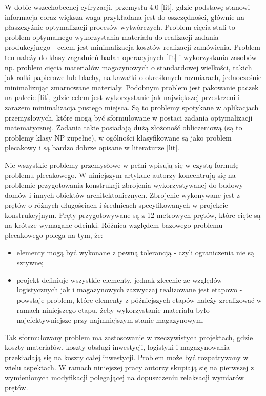 W dobie wszechobecnej cyfryzacji, przemysłu 4.0 [lit], gdzie podstawę stanowi informacja coraz większa waga przykładana jest do oszczędności, głównie na płaszczyźnie optymalizacji procesów wytwórczych. Problem cięcia stali to problem optymalnego wykorzystania materiału do realizacji zadania produkcyjnego - celem jest minimalizacja kosztów realizacji zamówienia. Problem ten należy do klasy zagadnień badan operacyjnych [lit] i wykorzystania zasobów - np. problem cięcia materiałów magazynowych o standardowej wielkości, takich jak rolki papierowe lub blachy, na kawałki o określonych rozmiarach, jednocześnie minimalizując zmarnowane materiały. Podobnym problem jest pakowanie paczek na palecie [lit], gdzie celem jest wykorzystanie jak największej przestrzeni i zarazem minimalizacja pustego miejsca. Są to problemy spotykane w aplikacjach przemysłowych, które mogą być sformułowane w postaci zadania optymalizacji matematycznej. Zadania takie posiadają dużą złożoność obliczeniową (są to problemy klasy NP zupełne), w ogólności klasyfikowane są jako problem plecakowy i są bardzo dobrze opisane w literaturze [lit].

Nie wszystkie problemy przemysłowe w pełni wpisują się w czystą formułę problemu plecakowego. W niniejszym artykule autorzy koncentrują się na problemie przygotowania konstrukcji zbrojenia wykorzystywanej do budowy domów i innych obiektów architektonicznych. Zbrojenie wykonywane jest z prętów o różnych długościach i średnicach specyfikowanych w projekcie konstrukcyjnym. Pręty przygotowywane są z 12 metrowych prętów, które cięte są na krótsze wymagane odcinki. Różnica względem bazowego problemu plecakowego polega na tym, że:
\begin{itemize}
\item elementy mogą być wykonane z pewną tolerancją - czyli ograniczenia nie są sztywne;
\item projekt definiuje wszystkie elementy, jednak zlecenie ze względów logistycznych jak i magazynowych zazwyczaj realizowane jest etapowo - powstaje problem, które elementy z późniejszych etapów należy zrealizować w ramach niniejszego etapu, żeby wykorzystanie materiału było najefektywniejsze przy najmniejszym stanie magazynowym. 
\end{itemize}

Tak sformułowany problem ma zastosowanie w rzeczywistych projektach, gdzie koszty materiałów, koszty obsługi inwestycji, logistyki i magazynowania przekładają się na koszty całej inwestycji. Problem może być rozpatrywany w wielu aspektach. W ramach niniejszej pracy autorzy skupiają się na pierwszej z wymienionych modyfikacji polegającej na dopuszczeniu relaksacji wymiarów prętów. 

